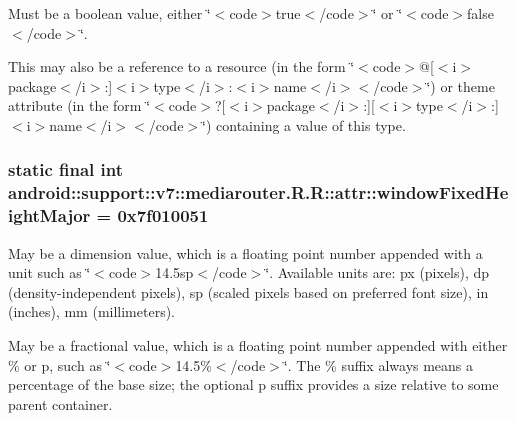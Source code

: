 Must be a boolean value, either \char`\"{}$<$code$>$true$<$/code$>$\char`\"{} or \char`\"{}$<$code$>$false$<$/code$>$\char`\"{}. 

This may also be a reference to a resource (in the form \char`\"{}$<$code$>$@\mbox{[}$<$i$>$package$<$/i$>$:\mbox{]}$<$i$>$type$<$/i$>$:$<$i$>$name$<$/i$>$$<$/code$>$\char`\"{}) or theme attribute (in the form \char`\"{}$<$code$>$?\mbox{[}$<$i$>$package$<$/i$>$:\mbox{]}\mbox{[}$<$i$>$type$<$/i$>$:\mbox{]}$<$i$>$name$<$/i$>$$<$/code$>$\char`\"{}) containing a value of this type. \hypertarget{classandroid_1_1support_1_1v7_1_1mediarouter_1_1_r_1_1attr_3ff49b506aac69e0a15aede04c51daf3}{
\subsubsection[{windowFixedHeightMajor}]{\setlength{\rightskip}{0pt plus 5cm}static final int android::support::v7::mediarouter.R.R::attr::windowFixedHeightMajor = 0x7f010051}}
\label{classandroid_1_1support_1_1v7_1_1mediarouter_1_1_r_1_1attr_3ff49b506aac69e0a15aede04c51daf3}


May be a dimension value, which is a floating point number appended with a unit such as \char`\"{}$<$code$>$14.5sp$<$/code$>$\char`\"{}. Available units are: px (pixels), dp (density-independent pixels), sp (scaled pixels based on preferred font size), in (inches), mm (millimeters). 

May be a fractional value, which is a floating point number appended with either \% or p, such as \char`\"{}$<$code$>$14.5\%$<$/code$>$\char`\"{}. The \% suffix always means a percentage of the base size; the optional p suffix provides a size relative to some parent container. 

